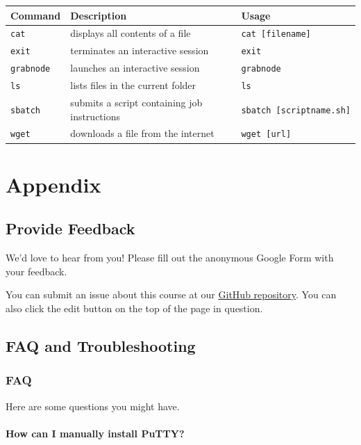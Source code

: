 \documentclass[
]{book}
\begin{document}
\begin{longtable}[]{@{}lll@{}}
\toprule
Command & Description & Usage \\
\midrule
\endhead
\texttt{cat} & displays all contents of a file & \texttt{cat\ {[}filename{]}} \\
\texttt{exit} & terminates an interactive session & \texttt{exit} \\
\texttt{grabnode} & launches an interactive session & \texttt{grabnode} \\
\texttt{ls} & lists files in the current folder & \texttt{ls} \\
\texttt{sbatch} & submits a script containing job instructions & \texttt{sbatch\ {[}scriptname.sh{]}} \\
\texttt{wget} & downloads a file from the internet & \texttt{wget\ {[}url{]}} \\
\bottomrule
\end{longtable}

\hypertarget{part-appendix}{%
\part*{Appendix}\label{part-appendix}}

\hypertarget{feedback}{%
\chapter{Provide Feedback}\label{feedback}}

We'd love to hear from you! Please fill out the anonymous Google Form with your feedback.

You can submit an issue about this course at our \href{https://github.com/fhdsl/FH_Cluster_Guide/issues/new}{GitHub repository}. You can also click the edit button on the top of the page in question.

\hypertarget{faq-and-troubleshooting}{%
\chapter{FAQ and Troubleshooting}\label{faq-and-troubleshooting}}

\hypertarget{faq}{%
\section{FAQ}\label{faq}}

Here are some questions you might have.

\hypertarget{manual-putty}{%
\subsection{How can I manually install PuTTY?}\label{manual-putty}}
\end{document}
